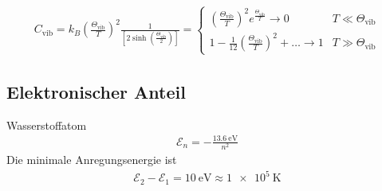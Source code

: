 %
\begin{align*}
    C_\text{vib} = k_B \left( \frac{\Theta_\text{vib}}{T} \right)^2
    \frac{1}{\left[ 2 \sinh\left( \frac{\Theta_\text{vib}}{2} \right) \right]}
    = \begin{cases}
        \left( \frac{\Theta_\text{vib}}{T} \right)^2 e^{\frac{\Theta_\text{vib}}{T}} \to 0 & T \ll \Theta_\text{vib} \\
        1 - \frac{1}{12}\left( \frac{\Theta_\text{vib}}{T} \right)^2 + \ldots \to 1 & T \gg \Theta_\text{vib}
    \end{cases} 
\end{align*}
%

\subsection*{Elektronischer Anteil}
Wasserstoffatom
%
\begin{align*}
    \mathcal{E}_n = - \frac{\SI{13.6}{\electronvolt}}{n^2}
\end{align*}
%
Die minimale Anregungsenergie ist
%
\begin{align*}
    \mathcal{E}_2 - \mathcal{E}_1 = \SI{10}{\electronvolt} \approx \SI{1e5}{\kelvin}
\end{align*}
%
